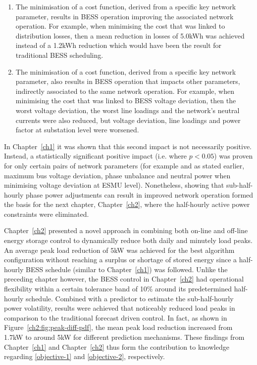 \begin{enumerate}
	\item The minimisation of a cost function, derived from a specific key network parameter, results in BESS operation  improving the associated network operation. For example, when minimising the cost that was linked to distribution losses, then a mean reduction in losses of 5.0kWh was achieved instead of a 1.2kWh reduction which would have been the result for traditional BESS scheduling.
	\item The minimisation of a cost function, derived from a specific key network parameter, also results in BESS operation that impacts other parameters, indirectly associated to the same network operation. For example, when minimising the cost that was linked to BESS voltage deviation, then the worst voltage deviation, the worst line loadings and the network's neutral currents were also reduced, but voltage deviation, line loadings and power factor at substation level were worsened.
\end{enumerate}

In Chapter~\ref{ch1} it was shown that this second impact is not necessarily positive.
Instead, a statistically significant positive impact (i.e. where $p<0.05$) was proven for only certain pairs of network parameters (for example and as stated earlier, maximum bus voltage deviation, phase unbalance and neutral power when minimising voltage deviation at ESMU level).
Nonetheless, showing that sub-half-hourly phase power adjustments can result in improved network operation formed the basis for the next chapter, Chapter~\ref{ch2}, where the half-hourly active power constraints were eliminated.

Chapter~\ref{ch2} presented a novel approach in combining both on-line and off-line energy storage control to dynamically reduce both daily and minutely load peaks.
An average peak load reduction of 5kW was achieved for the best algorithm configuration without reaching a surplus or shortage of stored energy since a half-hourly BESS schedule (similar to Chapter~\ref{ch1}) was followed.
Unlike the preceding chapter however, the BESS control in Chapter~\ref{ch2} had operational flexibility within a certain tolerance band of 10\% around its predetermined half-hourly schedule.
Combined with a predictor to estimate the sub-half-hourly power volatility, results were achieved that noticeably reduced load peaks in comparison to the traditional forecast driven control.
In fact, as shown in Figure~\ref{ch2:fig:peak-diff-pdf}, the mean peak load reduction increased from 1.7kW to around 5kW for different prediction mechanisms.
These findings from Chapter~\ref{ch1} and Chapter~\ref{ch2} thus form the contribution to knowledge regarding \ref{objective-1} and \ref{objective-2}, respectively.


